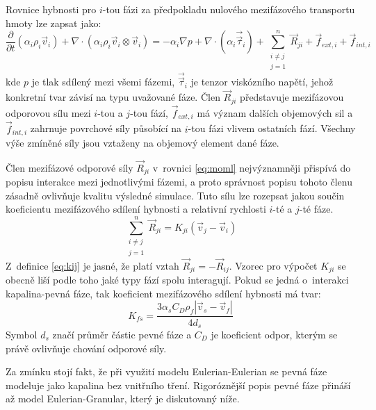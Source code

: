 Rovnice hybnosti pro $i$-tou fázi za předpokladu nulového mezifázového transportu hmoty lze zapsat jako:
\begin{equation}
	\frac{\partial}{\partial t} \left(\alpha_{i}\rho_{i}\vec{v}_{i}\right) + \nabla \cdot (\alpha_{i}\rho_{i} \vec{v}_{i} \otimes \vec{v}_{i}) = -\alpha_{i} \nabla p + \nabla \cdot \left(\alpha_{i} \vec{\vec{\tau}}_{i} \right) +\sum_{\substack{ i \neq j \\ j=1}}^{n} \vec{R}_{ji} + \vec{f}_{ext,i} + \vec{f}_{int,i}
	\label{eq:moml}
\end{equation}
\noindent kde $p$ je tlak sdílený mezi všemi fázemi, $\vec{\vec{\tau}}_{i}$ je tenzor viskózního napětí, jehož konkretní tvar závisí na typu uvažované fáze. Člen $\vec{R}_{ji}$ představuje mezifázovou odporovou sílu mezi $i$-tou a $j$-tou fází, $\vec{f}_{ext,i}$ má význam dalších objemových sil a $\vec{f}_{int,i}$ zahrnuje povrchové síly působící na $i$-tou fázi vlivem ostatních fází. Všechny výše zmíněné síly jsou vztaženy na objemový element dané fáze. 

Člen mezifázové odporové síly $\vec{R}_{ji}$ v~rovnici \ref{eq:moml} nejvýznamněji přispívá do popisu interakce mezi jednotlivými fázemi, a proto správnost popisu tohoto členu zásadně ovlivňuje kvalitu výsledné simulace. Tuto sílu lze rozepsat jakou součin koeficientu mezifázového sdílení hybnosti a relativní rychlosti $i$-té a $j$-té fáze.
\begin{equation}
	 \sum_{\substack{ i \neq j \\ j=1}}^{n} \vec{R}_{ji} = K_{ji} \left( \vec{v}_{j} - \vec{v}_{i} \right)
	\label{eq:kij}
\end{equation}
Z~definice \ref{eq:kij} je jasné, že platí vztah $\vec{R}_{ji} = -\vec{R}_{ij}$. Vzorec pro výpočet $K_{ji}$ se obecně liší podle toho jaké typy fází spolu interagují. Pokud se jedná o~interakci kapalina-pevná fáze, tak koeficient mezifázového sdílení hybnosti má tvar:
\begin{equation}
	K_{fs}= \frac{3\alpha_{s}C_{D}\rho_{f}\left|\vec{v}_{s} - \vec{v}_{f}\right|}{4d_{s}}
	\label{eq:kfs}
\end{equation}
Symbol $d_{s}$ značí průměr částic pevné fáze a $C_{D}$ je koeficient odpor, kterým se právě ovlivňuje chování odporové síly. 
 
Za zmínku stojí fakt, že při využití modelu Eulerian-Eulerian se pevná fáze modeluje jako kapalina bez vnitřního tření. Rigoróznější popis pevné fáze přináší až model Eulerian-Granular, který je diskutovaný níže. 

